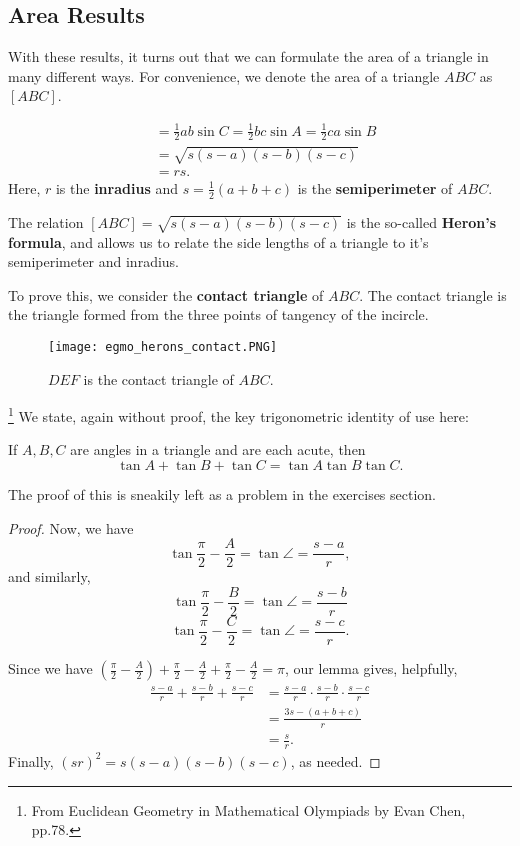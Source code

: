 \documentclass[../jarvis.tex]{subfiles}
\begin{document}
\subsection{Area Results \ez}
With these results, it turns out that we can formulate the area of a triangle in many different ways. For convenience, we denote the area of a triangle $ABC$ as $[ABC]$.
\begin{theorem}
    \begin{align*}
        [ABC] &=\frac{1}{2}ab\sin{C}=\frac{1}{2}bc\sin{A}=\frac{1}{2}ca\sin{B} \\
        &=\sqrt{s(s-a)(s-b)(s-c)} \\
        &=rs.
    \end{align*}
    Here, $r$ is the \textbf{inradius} and $s=\frac{1}{2}(a+b+c)$ is the \textbf{semiperimeter} of $ABC$.
\end{theorem}
The relation $[ABC]=\sqrt{s(s-a)(s-b)(s-c)}$ is the so-called \textbf{Heron's formula}, and allows us to relate the side lengths of a triangle to it's semiperimeter and inradius.

To prove this, we consider the \textbf{contact triangle} of $ABC$. The contact triangle is the triangle formed from the three points of tangency of the incircle.
\begin{figure}[H]
    \centering
    \texttt{[image: egmo\_herons\_contact.PNG]}
    \caption{$DEF$ is the contact triangle of $ABC$.\protect\footnotemark}
\end{figure}
\footnote{From Euclidean Geometry in Mathematical Olympiads by Evan Chen, pp.78.}
We state, again without proof, the key trigonometric identity of use here:
\begin{lemma}
    If $A,B,C$ are angles in a triangle and are each acute, then 
    $$\tan{A}+\tan{B}+\tan{C}=\tan{A}\tan{B}\tan{C}.$$
\end{lemma}
The proof of this is sneakily left as a problem in the exercises section.

\begin{proof}
    Now, we have
    $$\tan{\frac{\pi}{2}-\frac{A}{2}}=\tan{\angle}=\frac{s-a}{r},$$
    and similarly,
    $$\tan{\frac{\pi}{2}-\frac{B}{2}}=\tan{\angle}=\frac{s-b}{r}$$
    $$\tan{\frac{\pi}{2}-\frac{C}{2}}=\tan{\angle}=\frac{s-c}{r}.$$
    
    Since we have $\left(\frac{\pi}{2}-\frac{A}{2}\right)+\frac{\pi}{2}-\frac{A}{2}+\frac{\pi}{2}-\frac{A}{2}=\pi$,
    our lemma gives, helpfully,
    \begin{align*}
        \frac{s-a}{r}+\frac{s-b}{r}+\frac{s-c}{r}&=\frac{s-a}{r}\cdot\frac{s-b}{r}\cdot\frac{s-c}{r} \\
        &=\frac{3s-(a+b+c)}{r} \\
        &=\frac{s}{r}.
    \end{align*}
    Finally, $(sr)^2=s(s-a)(s-b)(s-c)$, as needed.
\end{proof}
\end{document}
